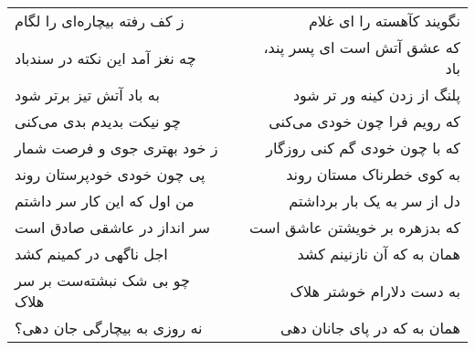 \begin{center}
\begin{longtable}{l p{0.5cm} r}
\\
ز کف رفته بیچاره‌ای را لگام
&&
نگویند کآهسته را ای غلام
\\
چه نغز آمد این نکته در سندباد
&&
که عشق آتش است ای پسر پند، باد
\\
به باد آتش تیز برتر شود
&&
پلنگ از زدن کینه ور تر شود
\\
چو نیکت بدیدم بدی می‌کنی
&&
که رویم فرا چون خودی می‌کنی
\\
ز خود بهتری جوی و فرصت شمار
&&
که با چون خودی گم کنی روزگار
\\
پی چون خودی خودپرستان روند
&&
به کوی خطرناک مستان روند
\\
من اول که این کار سر داشتم
&&
دل از سر به یک بار برداشتم
\\
سر انداز در عاشقی صادق است
&&
که بدزهره بر خویشتن عاشق است
\\
اجل ناگهی در کمینم کشد
&&
همان به که آن نازنینم کشد
\\
چو بی شک نبشته‌ست بر سر هلاک
&&
به دست دلارام خوشتر هلاک
\\
نه روزی به بیچارگی جان دهی؟
&&
همان به که در پای جانان دهی
\\
\end{longtable}
\end{center}
